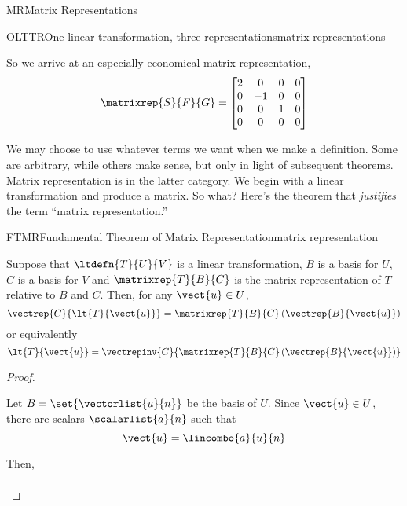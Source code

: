 \begin{subsect}{MR}{Matrix Representations}
\begin{example}{OLTTR}{One linear transformation, three representations}{matrix representations}
%
\begin{para}So we arrive at an especially economical matrix representation,
%
\begin{equation*}
\matrixrep{S}{F}{G}=
\begin{bmatrix}
2 & 0 & 0 & 0 \\
0 & -1 & 0 & 0 \\
0 & 0 & 1 & 0 \\
0 & 0 & 0 & 0
\end{bmatrix}
\end{equation*}
\end{para}
%
\end{example}
%
\begin{para}We may choose to use whatever terms we want when we make a definition.  Some are arbitrary, while others make sense, but only in light of subsequent theorems.  Matrix representation is in the latter category.  We begin with a linear transformation and produce a matrix.  So what?  Here's the theorem that {\em justifies} the term ``matrix representation.''\end{para}
%
\begin{theorem}{FTMR}{Fundamental Theorem of Matrix Representation}{matrix representation}
\begin{para}Suppose that $\ltdefn{T}{U}{V}$ is a linear transformation, $B$ is a basis for $U$, $C$ is a basis for $V$ and $\matrixrep{T}{B}{C}$ is the matrix representation of $T$ relative to $B$ and $C$.  Then, for any $\vect{u}\in U$,
%
\begin{equation*}
\vectrep{C}{\lt{T}{\vect{u}}}=\matrixrep{T}{B}{C}\left(\vectrep{B}{\vect{u}}\right)
\end{equation*}
%
or equivalently
%
\begin{equation*}
\lt{T}{\vect{u}}=\vectrepinv{C}{\matrixrep{T}{B}{C}\left(\vectrep{B}{\vect{u}}\right)}
\end{equation*}
\end{para}
%
\end{theorem}
%
\begin{proof}
\begin{para}Let $B=\set{\vectorlist{u}{n}}$ be the basis of $U$.  Since $\vect{u}\in U$, there are scalars $\scalarlist{a}{n}$ such that
%
\begin{equation*}
\vect{u}=\lincombo{a}{u}{n}
\end{equation*}
\end{para}
%
\begin{para}Then,
%
\begin{align*}

\end{align*}
\end{para}
\end{proof}
\end{subsect}
